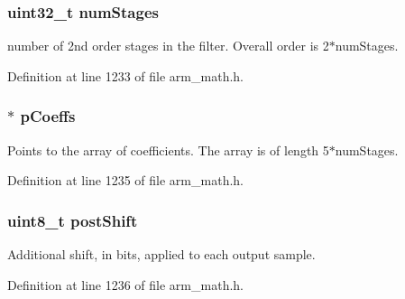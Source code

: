 \subsubsection[{\texorpdfstring{num\+Stages}{numStages}}]{\setlength{\rightskip}{0pt plus 5cm}uint32\+\_\+t num\+Stages}\hypertarget{structarm__biquad__casd__df1__inst__q31_aed9c8a6224cd149e8e12b17b25b9b767}{}\label{structarm__biquad__casd__df1__inst__q31_aed9c8a6224cd149e8e12b17b25b9b767}
number of 2nd order stages in the filter. Overall order is 2$\ast$num\+Stages. 

Definition at line 1233 of file arm\+\_\+math.\+h.

\subsubsection[{\texorpdfstring{p\+Coeffs}{pCoeffs}}]{$\ast$ p\+Coeffs}\hypertarget{structarm__biquad__casd__df1__inst__q31_a68888e36167d81cb7836db10367a1682}{}\label{structarm__biquad__casd__df1__inst__q31_a68888e36167d81cb7836db10367a1682}
Points to the array of coefficients. The array is of length 5$\ast$num\+Stages. 

Definition at line 1235 of file arm\+\_\+math.\+h.

\subsubsection[{\texorpdfstring{post\+Shift}{postShift}}]{\setlength{\rightskip}{0pt plus 5cm}uint8\+\_\+t post\+Shift}\hypertarget{structarm__biquad__casd__df1__inst__q31_a74050e9f36542bd56f4052381a82ae8f}{}\label{structarm__biquad__casd__df1__inst__q31_a74050e9f36542bd56f4052381a82ae8f}
Additional shift, in bits, applied to each output sample. 

Definition at line 1236 of file arm\+\_\+math.\+h.

